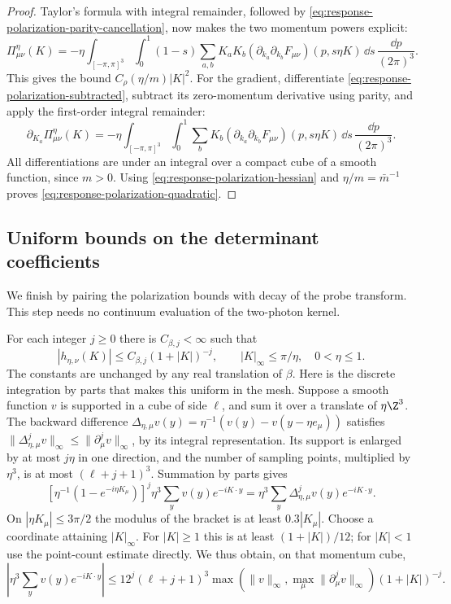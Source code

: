 \documentclass[11pt,letterpaper,reqno]{amsart}
\begin{document}
\begin{proof}
Taylor's formula with integral remainder, followed by
\eqref{eq:response-polarization-parity-cancellation}, now makes
the two momentum powers explicit:
\begin{equation}\label{eq:response-polarization-taylor}
 \Pi^\eta_{\mu\nu}(K)=
   -\eta\int_{[-\pi,\pi]^3}\int_0^1(1-s)
      \sum_{a,b}K_aK_b
       (\partial_{k_a}\partial_{k_b}F_{\mu\nu})(p,s\eta K)
                           \,\dd s\,\frac{\dd p}{(2\pi)^3}.
\end{equation}
This gives the bound $C_\rho(\eta/m)|K|^2$.
For the gradient, differentiate
\eqref{eq:response-polarization-subtracted}, subtract its
zero-momentum derivative using parity, and apply the
first-order integral remainder:
\[
 \partial_{K_a}\Pi^\eta_{\mu\nu}(K)=
  -\eta\int_{[-\pi,\pi]^3}\int_0^1
       \sum_bK_b(\partial_{k_a}\partial_{k_b}F_{\mu\nu})(p,s\eta K)
                              \,\dd s\,\frac{\dd p}{(2\pi)^3}.
\]
All differentiations are under an integral over a compact cube
of a smooth function, since $m>0$. Using
\eqref{eq:response-polarization-hessian} and $\eta/m=\bar m^{-1}$
proves \eqref{eq:response-polarization-quadratic}.
\end{proof}

\subsection{Uniform bounds on the determinant coefficients}
\label{subsec:response-uniform-coefficients}

We finish by pairing the polarization bounds with decay of the
probe transform. This step needs no continuum evaluation of
the two-photon kernel.

For each integer $j\ge0$ there is $C_{\beta,j}<\infty$ such that
\begin{equation}\label{eq:response-midpoint-decay}
 |h_{\eta,\nu}(K)|\le C_{\beta,j}(1+|K|)^{-j},
                \qquad |K|_\infty\le\pi/\eta,\quad0<\eta\le1.
\end{equation}
The constants are unchanged by any real translation of $\beta$.
Here is the discrete integration by parts that makes this
uniform in the mesh. Suppose a smooth function $v$ is supported
in a cube of side $\ell$, and sum it over a translate of $\eta\Z^3$.
The backward difference
$\Delta_{\eta,\mu}v(y)=\eta^{-1}(v(y)-v(y-\eta e_\mu))$
satisfies
$\|\Delta_{\eta,\mu}^jv\|_\infty
\le\|\partial_\mu^jv\|_\infty$, by its integral representation.
Its support is enlarged by at most $j\eta$ in one direction,
and the number of sampling points, multiplied by $\eta^3$,
is at most $(\ell+j+1)^3$. Summation by parts gives
\[
 [\eta^{-1}(1-e^{-i\eta K_\mu})]^j
       \eta^3\sum_yv(y)e^{-iK\cdot y}
          =\eta^3\sum_y\Delta_{\eta,\mu}^jv(y)e^{-iK\cdot y}.
\]
On $|\eta K_\mu|\le3\pi/2$ the modulus of the bracket
is at least $0.3|K_\mu|$. Choose a coordinate attaining
$|K|_\infty$. For $|K|\ge1$ this is at least
$(1+|K|)/12$; for $|K|<1$ use the point-count estimate directly.
We thus obtain, on that momentum cube,
\[
 \left|\eta^3\sum_yv(y)e^{-iK\cdot y}\right|
 \le12^j(\ell+j+1)^3
       \max(\|v\|_\infty,\max_\mu\|\partial_\mu^jv\|_\infty)
                                               (1+|K|)^{-j}.
\]
\end{document}

